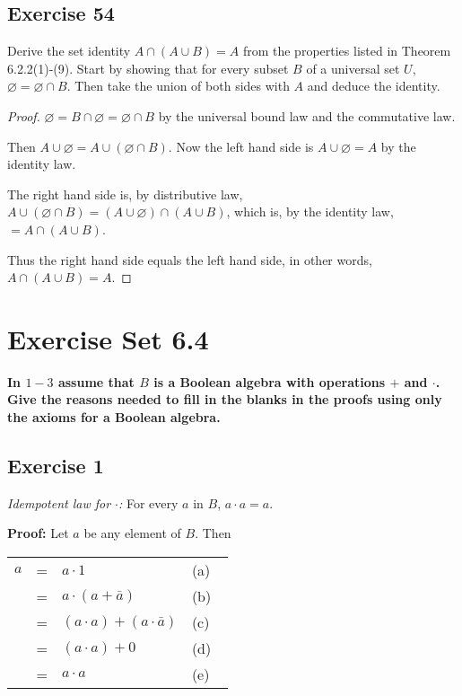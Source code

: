\documentclass[14pt]{extarticle}
\newcommand{\es}{\varnothing}
\newcommand{\fbl}{\underline{\hspace{1cm}}\,\,}
\newcommand{\cy}{\color{cyan}}
\begin{document}
\subsection{Exercise 54}
Derive the set identity \(A \cap (A \cup B) = A\) from the properties listed in Theorem 6.2.2(1)-(9). Start by showing
that for every subset $B$ of a universal set $U$, \(\es = \es \cap B\). Then take the union of both sides with $A$
and deduce the identity.

\begin{proof}
  \(\es = B \cap \es = \es \cap B\) by the universal bound law and the commutative law.

  Then \(A \cup \es = A \cup (\es \cap B)\). Now the left hand side is \(A \cup \es = A\) by the identity law.

  The right hand side is, by distributive law, \(A \cup (\es \cap B) = (A \cup \es) \cap (A \cup B)\), which is, by the
  identity law, \(= A \cap (A \cup B)\).

  Thus the right hand side equals the left hand side, in other words, \(A \cap (A \cup B) = A\).
\end{proof}

\section{Exercise Set 6.4}

 {\bf \cy In $1-3$ assume that $B$ is a Boolean algebra with operations $+$ and $\cdot$. Give the reasons needed to fill
  in the blanks in the proofs using only the axioms for a Boolean algebra.}

\subsection{Exercise 1}
{\it Idempotent law for $\cdot$:} For every $a$ in $B$, \(a \cdot a = a\).

  {\bf Proof:} Let $a$ be any element of $B$. Then

\begin{center}
  \begin{tabular}{rcll}
    \(a\) & = & \(a \cdot 1\)                       & {\cy (a) \fbl} \\
    \(\)  & = & \(a \cdot (a + \bar{a})\)           & {\cy (b) \fbl} \\
    \(\)  & = & \((a \cdot a) + (a \cdot \bar{a})\) & {\cy (c) \fbl} \\
    \(\)  & = & \((a \cdot a) + 0\)                 & {\cy (d) \fbl} \\
    \(\)  & = & \(a \cdot a\)                       & {\cy (e) \fbl}
  \end{tabular}
\end{center}
\end{document}
